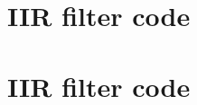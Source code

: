 %
%
%
%
%
%
%


\section{IIR filter code}
\label{sec:src_df2_order1_cpp}


\section{IIR filter code}
\label{sec:src_df2_order2_cpp}

